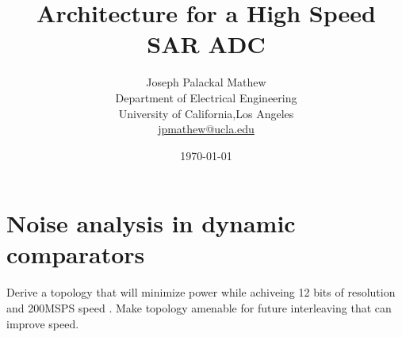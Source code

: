 \documentclass[a4paper,10pt,fleqn,titlepage,twoside]{article}
\title{Architecture for a High Speed SAR ADC}
\author{
        Joseph Palackal Mathew \\
	Department of Electrical Engineering\\
        University of California,Los Angeles\\ 
	\href{mailto:jpmathew@ucla.edi}{jpmathew@ucla.edu}
}
\date{\today}
\begin{document}
\maketitle

\section*{Noise analysis in dynamic comparators}
Derive a topology that will minimize power while achiveing 12 bits of resolution and 200MSPS speed . Make topology amenable for future interleaving 
that can improve speed.
\end{document}
